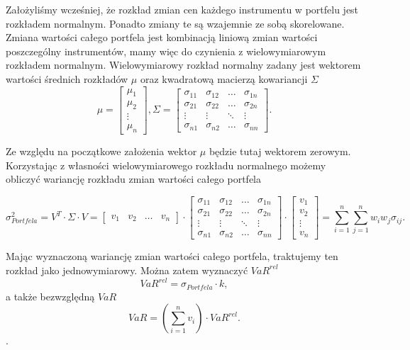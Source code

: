 \documentclass[11pt,titlepage]{article}
\numberwithin{equation}{section}
\begin{document}
Założyliśmy wcześniej, że rozkład zmian cen każdego instrumentu w portfelu jest rozkładem normalnym. Ponadto zmiany te są wzajemnie ze sobą skorelowane. Zmiana wartości całego portfela jest kombinacją liniową zmian wartości poszczególny instrumentów, mamy więc do czynienia z wielowymiarowym rozkładem normalnym. Wielowymiarowy rozkład normalny zadany jest wektorem wartości średnich rozkładów $\mu$ oraz kwadratową macierzą kowariancji $\Sigma$
$$\mu=\begin{bmatrix}
 \mu_1 \\ 
 \mu_2 \\
\vdots \\
\mu_n
\end{bmatrix},\Sigma=\begin{bmatrix}
\sigma_{11} & \sigma_{12} & \hdots & \sigma_{1n} \\ 
\sigma_{21} & \sigma_{22} & \hdots & \sigma_{2n} \\
\vdots & \vdots & \ddots & \vdots\\
\sigma_{n1} & \sigma_{n2} & \hdots & \sigma_{nn}
\end{bmatrix}. $$

Ze względu na początkowe założenia wektor $\mu$ będzie tutaj wektorem zerowym. Korzystając z własności wielowymiarowego rozkładu normalnego możemy obliczyć wariancję rozkładu zmian wartości całego portfela 


$$ \sigma_{Portfela}^2 = V^T  \cdot \Sigma \cdot V =  \begin{bmatrix}
 v_1 & v_2 & \hdots & v_n
\end{bmatrix} 
\cdot
\begin{bmatrix}
\sigma_{11} & \sigma_{12} & \hdots & \sigma_{1n} \\ 
\sigma_{21} & \sigma_{22} & \hdots & \sigma_{2n} \\
\vdots & \vdots & \ddots & \vdots\\
\sigma_{n1} & \sigma_{n2} & \hdots & \sigma_{nn}
\end{bmatrix}  
\cdot
\begin{bmatrix}
 v_1 \\ 
 v_2 \\
\vdots \\
v_n
\end{bmatrix}
=\sum_{i=1}^{n}\sum_{j=1}^{n}w_i w_j \sigma_{ij}.
$$


Mając wyznaczoną wariancję zmian wartości całego portfela, traktujemy ten rozkład jako jednowymiarowy. Można zatem wyznaczyć $VaR^{rel}$
$$VaR^{rel}=\sigma_{Portfela} \cdot k,$$
a także bezwzględną $VaR$
$$VaR = (\sum_{i=1}^{n}v_i) \cdot VaR^{rel}.$$.
\end{document}
